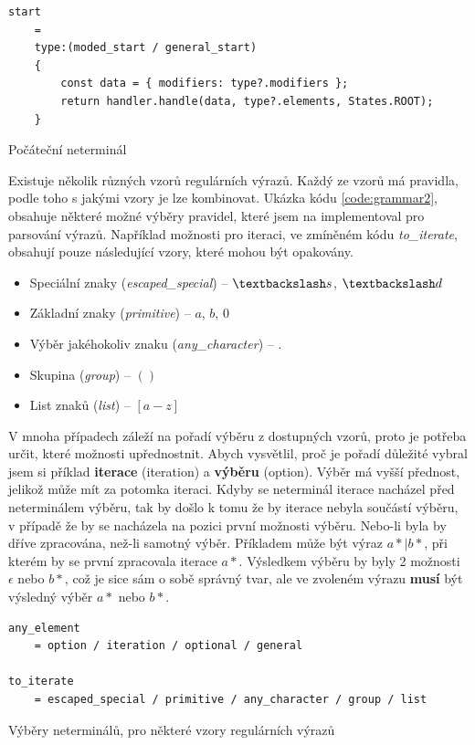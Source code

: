 \begin{code}[!ht]
	\begin{verbatim}
start 
	= 
	type:(moded_start / general_start)
	{
		const data = { modifiers: type?.modifiers };
		return handler.handle(data, type?.elements, States.ROOT);
	}
	\end{verbatim}
	\caption{Počáteční neterminál}
	\label{code:grammar1}
\end{code}

Existuje několik různých vzorů regulárních výrazů.
Každý ze vzorů má pravidla, podle toho s jakými vzory je lze kombinovat.
Ukázka kódu \ref{code:grammar2}, obsahuje některé možné výběry pravidel, které jsem na implementoval pro parsování výrazů.
Například možnosti pro iteraci, ve zmíněném kódu \textit{to\_iterate}, obsahují pouze následující vzory, které mohou být opakovány.

\begin{itemize}
	\item Speciální znaky (\textit{escaped\_special}) -- $\textbackslash s$, $\textbackslash d$
	\item Základní znaky (\textit{primitive}) -- $a$, $b$, $0$
	\item Výběr jakéhokoliv znaku (\textit{any\_character}) -- $.$
	\item Skupina (\textit{group}) -- $()$
	\item List znaků (\textit{list}) -- $[a-z]$
\end{itemize}

V mnoha případech záleží na pořadí výběru z dostupných vzorů, proto je potřeba určit, které možnosti upřednostnit.
Abych vysvětlil, proč je pořadí důležité vybral jsem si příklad \textbf{iterace} (iteration) a \textbf{výběru} (option).
Výběr má vyšší přednost, jelikož může mít za potomka iteraci.
Kdyby se neterminál iterace nacházel před neterminálem výběru, tak by došlo k tomu že by iterace nebyla součástí výběru, v případě že by se nacházela na pozici první možnosti výběru. 
Nebo-li byla by dříve zpracována, než-li samotný výběr.
Příkladem může být výraz $a*|b*$, při kterém by se první zpracovala iterace $a*$.
Výsledkem výběru by byly 2 možnosti $\epsilon$ nebo $b*$, což je sice sám o sobě správný tvar, ale ve zvoleném výrazu \textbf{musí} být výsledný výběr $a*$ nebo $b*$.

\begin{code}[!ht]
	\begin{verbatim}
any_element 
	= option / iteration / optional / general

to_iterate
	= escaped_special / primitive / any_character / group / list
	\end{verbatim}
	\caption{Výběry neterminálů, pro některé vzory regulárních výrazů}
	\label{code:grammar2}
\end{code}

